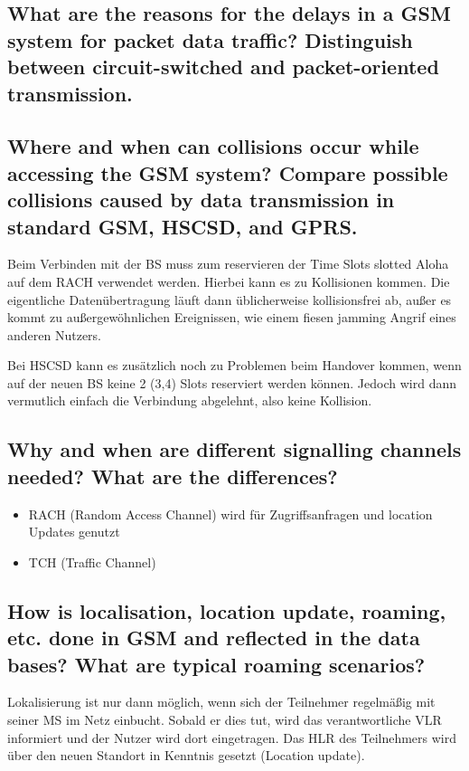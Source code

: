 \subsection{What are the reasons for the delays in a GSM system for packet data traffic? Distinguish between circuit-switched and packet-oriented transmission.}

\subsection{Where and when can collisions occur while accessing the GSM system? Compare possible collisions caused by data transmission in standard GSM, HSCSD, and GPRS.}
Beim Verbinden mit der BS muss zum reservieren der Time Slots slotted Aloha auf dem RACH verwendet werden. Hierbei kann es zu Kollisionen kommen. Die eigentliche Datenübertragung läuft dann üblicherweise kollisionsfrei ab, außer es kommt zu außergewöhnlichen Ereignissen, wie einem fiesen jamming Angrif eines anderen Nutzers.

Bei HSCSD kann es zusätzlich noch zu Problemen beim Handover kommen, wenn auf der neuen BS keine 2 (3,4) Slots reserviert werden können. Jedoch wird dann vermutlich einfach die Verbindung abgelehnt, also keine Kollision. 


\subsection{Why and when are different signalling channels needed? What are the differences?}
\begin{itemize}
\item RACH (Random Access Channel) wird für Zugriffsanfragen und location Updates genutzt

\item TCH (Traffic Channel)

\end{itemize}

\subsection{How is localisation, location update, roaming, etc. done in GSM and reflected in the data bases? What are typical roaming scenarios?}
Lokalisierung ist nur dann möglich, wenn sich der Teilnehmer regelmäßig mit seiner MS im Netz einbucht. Sobald er dies tut, wird das verantwortliche VLR informiert und der Nutzer wird dort eingetragen. Das HLR des Teilnehmers wird über den neuen Standort in Kenntnis gesetzt (Location update).


